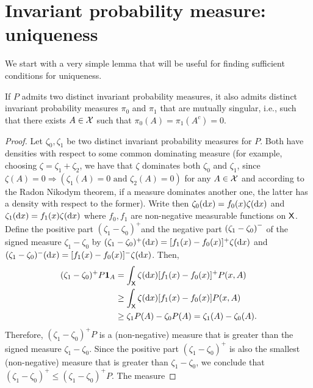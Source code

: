 \documentclass[english,graybox,envcountchap,envcountsame,sectrefs,shortlabels]{svmono}
\theoremstyle{style}
\begin{document}
\section{Invariant probability measure: uniqueness}

We start with a very simple lemma that will be useful for finding
sufficient conditions for uniqueness. 
\begin{lemma}
\label{lem:invariant:singular} If $P$ admits two distinct invariant
probability measures, it also admits distinct invariant probability
measures $\pi_{0}$ and $\pi_{1}$ that are mutually singular, i.e.,
such that there exists $A\in\mathcal{X}$ such that $\pi_{0}(A)=\pi_{1}(A^{c})=0$.
\end{lemma}

\begin{proof}
Let $\zeta_{0},\zeta_{1}$ be two distinct invariant probability measures
for $P$. Both have densities with respect to some common dominating
measure (for example, choosing $\zeta=\zeta_{1}+\zeta_{2}$, we have
that $\zeta$ dominates both $\zeta_{0}$ and $\zeta_{1}$, since $\zeta(A)=0\Rightarrow(\zeta_{1}(A)=0\mbox{ and }\zeta_{2}(A)=0)$
for any $A\in\mathcal{X}$ and according to the Radon Nikodym theorem,
if a measure dominates another one, the latter has a density with
respect to the former). Write then $\zeta_{0}(\mathrm{d} x)=f_{0}(x)\zeta(\mathrm{d} x)$
and $\zeta_{1}(\mathrm{d} x)=f_{1}(x)\zeta(\mathrm{d} x)$ where $f_{0},f_{1}$
are non-negative measurable functions on $\mathsf{X}$. Define the positive
part  $(\zeta_{1}-\zeta_{0})^{+}$and the negative part $\left(\zeta_{1}-\zeta_{0}\right)^{-}$
of the signed measure $\zeta_{1}-\zeta_{0}$ by $(\zeta_{1}-\zeta_{0})^{+}(\mathrm{d} x)=[f_{1}(x)-f_{0}(x)]^{+}\zeta(\mathrm{d} x)$
and $(\zeta_{1}-\zeta_{0})^{-}(\mathrm{d} x)=[f_{1}(x)-f_{0}(x)]^{-}\zeta(\mathrm{d} x)$.
Then,
\begin{align*}
(\zeta_{1}-\zeta_{0})^{+}P\mathbf{1}_{A} & =\int_{\mathsf{X}}\zeta(\mathrm{d} x)[f_{1}(x)-f_{0}(x)]^{+}P(x,A)\\
 & \geq\int_{\mathsf{X}}\zeta(\mathrm{d} x)[f_{1}(x)-f_{0}(x)]P(x,A)\\
 & \geq\zeta_{1}P(A)-\zeta_{0}P(A)=\zeta_{1}(A)-\zeta_{0}(A).
\end{align*}
Therefore, $(\zeta_{1}-\zeta_{0})^{+}P$ is a (non-negative) measure that
is greater than the signed measure $\zeta_{1}-\zeta_{0}$. Since the
positive part $(\zeta_{1}-\zeta_{0})^{+}$ is also the smallest (non-negative)
measure that is greater than $\zeta_{1}-\zeta_{0}$, we conclude that
$(\zeta_{1}-\zeta_{0})^{+}\leq(\zeta_{1}-\zeta_{0})^{+}P$. The measure

\end{proof}
\end{document}
